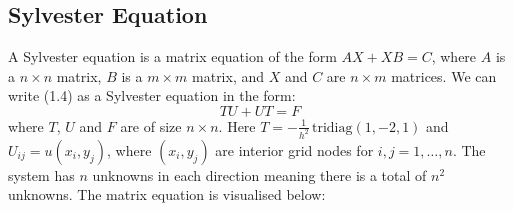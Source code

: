 \documentclass{article}
\numberwithin{equation}{section}
\begin{document}
\subsection{Sylvester Equation}
A Sylvester equation is a matrix equation of the form $AX + XB = C$, where $A$ is a $n \times n$ matrix, $B$ is a $m \times m$ matrix, and $X$ and $C$ are $n \times m$ matrices. We can write (1.4) as a Sylvester equation in the form:
	\begin{equation}
	TU + UT = F
	\end{equation}
where $T$, $U$ and $F$ are of size $n \times n$.
Here $T=-\frac{1}{h^2} \, \text{tridiag}(1,-2,1)$ and $U_{ij} = u(x_i, y_j)$, where $(x_i, y_j)$ are interior grid nodes for $i,j=1,\dots,n$. The system has $n$ unknowns in each direction meaning there is a total of $n^2$ unknowns. The matrix equation is visualised below:
\end{document}
